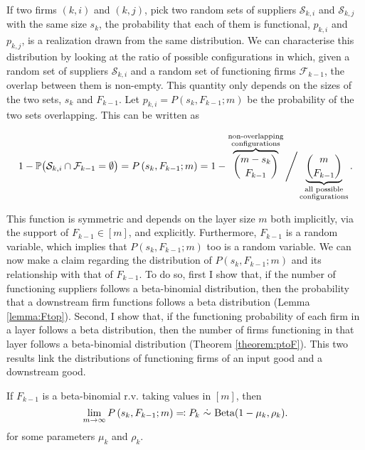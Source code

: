 \documentclass[../../main.tex]{subfiles}
\begin{document}
If two firms $(k, i)$ and $(k, j)$, pick two random sets of suppliers $\mathcal{S}_{k, i}$ and $\mathcal{S}_{k, j}$ with the same size $s_k$, the probability that each of them is functional, $p_{k, i}$ and $p_{k, j}$, is a realization drawn from the same distribution. We can characterise this distribution by looking at the ratio of possible configurations in which, given a random set of suppliers $\mathcal{S}_{k, i}$ and a random set of functioning firms $\mathcal{F}_{k - 1}$, the overlap between them is non-empty. This quantity only depends on the sizes of the two sets, $s_k$ and $F_{k - 1}$. Let $p_{k, i} = P(s_k, F_{k - 1}; m)$ be the probability of the two sets overlapping. This can be written as 

\begin{equation}
  1 - \P\big( \mathcal{S}_{k, i} \cap \mathcal{F}_{k - 1} = \emptyset \big) = P\left(s_k, F_{k - 1}; m\right) =  1 - \overbrace{\binom{m - s_k}{F_{k-1}}}^{\substack{\text{non-overlapping} \\ \text{configurations}}} \Bigg/ \underbrace{\binom{m}{F_{k-1}}}_{\substack{\text{all possible} \\ \text{configurations}}}. 
\end{equation}

This function is symmetric and depends on the layer size $m$ both implicitly, via the support of $F_{k - 1} \in [m]$, and explicitly. Furthermore, $F_{k - 1}$ is a random variable, which implies that $P(s_k, F_{k - 1}; m)$ too is a random variable. We can now make a claim regarding the distribution of $P(s_k, F_{k - 1}; m)$ and its relationship with that of $F_{k - 1}$. To do so, first I show that, if the number of functioning suppliers follows a beta-binomial distribution, then the probability that a downstream firm functions follows a beta distribution (Lemma \ref{lemma:Ftop}). Second, I show that, if the functioning probability of each firm in a layer follows a beta distribution, then the number of firms functioning in that layer follows a beta-binomial distribution (Theorem \ref{theorem:ptoF}). This two results link the distributions of functioning firms of an input good and a downstream good.

\begin{lemma} \label{lemma:Ftop}
  If $F_{k - 1}$ is a beta-binomial r.v. taking values in $[m]$, then \begin{equation*}\lim_{m \rightarrow \infty} P\left(s_k, F_{k - 1}; m\right) \eqqcolon P_k \ \dot{\sim} \ \Beta(1 - \mu_k, \rho_k).\end{equation*} for some parameters $\mu_k$ and $\rho_k$.
\end{lemma}
\end{document}
